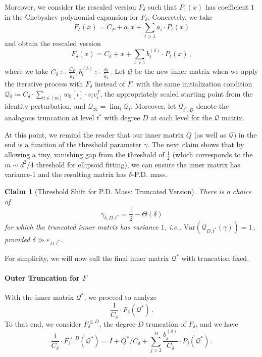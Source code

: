 \documentclass[12pt]{article}
\newcommand{\Var}{\mathrm{Var}}
\newtheorem{claim}[theorem]{Claim}
\newcommand{\calQ}{\mathcal{Q}}
\begin{document}
Moreover, we consider the rescaled version $F_\delta$ such that $P_1(x)$ has coefficient $1$ in the Chebyshev polynomial expansion for $F_\delta$. Concretely, we take \[
 \widetilde{F}_\delta(x) = \widetilde{C}_F + \widetilde{a}_1 x + \sum_{t>1} \widetilde{a}_i \cdot P_t(x)
 \]
 and obtain the rescaled version \[ 
 F_{\delta} (x) = C_\delta + x + \sum_{t>1} b^{(\delta)}_t \cdot P_t(x)\,,
 \]
 where we take \(
 C_\delta \coloneqq \frac{\widetilde{C}_F}{\widetilde{a}_1}, b^{(\delta)}_t\coloneqq  \frac{\widetilde{a}_t}{\widetilde{a}_1}\,.
  \)
  Let $\calQ$ be the new inner matrix when we apply the iterative process with $F_\delta$ instead of $F$, with the same initialization condition $\calQ_0 \coloneqq C_\delta \cdot \sum_{i\in[m]} w_0[i] \cdot v_iv_i^T$, the appropriately scaled starting point from the identity perturbation, and $\calQ_{\infty} = \lim_i \calQ_i$.  Moreover, let $\calQ_{t^*,D}$ denote the analogous truncation at level $t^*$ with degree $D$ at each level for the $\calQ$ matrix.

 At this point, we remind the reader that our inner matrix $Q$ (as well as $\calQ$) in the end is a function of the threshold parameter $\gamma$. The next claim shows that by allowing a tiny, vanishing gap from the threshold of $\frac{1}{2}$ (which corresponds to the $m\sim d^2/4$  threshold for ellipsoid fitting), we can ensure the inner matrix has variance-$1$ and the resulting matrix has $\delta$-P.D. mass.
 \begin{claim}[Threshold Shift for P.D. Mass: Truncated Version]
\label{claim:pd-shift-threshold}
There is a choice of
\[
    \gamma_{\delta,D,t^*}
    =
    \frac12-\Theta(\delta)
\]
for which the truncated inner matrix has variance $1$, i.e., \( 
\Var(\calQ_{D,t^*}(\gamma) )= 1\,,
\)
provided \(
    \delta \gg \varepsilon_{D,t^*}.
\)

\end{claim} 
 For simplicity, we will now call the final inner matrix $\calQ^*$ with truncation fixed.
 
 \paragraph{Outer Truncation for $F$}
 With the inner matrix   $\calQ^*$, we proceed to analyze \[ 
 \frac{1}{C_\delta} \cdot  F_\delta(\calQ^*)\,.
 \]
To that end, we consider $F_\delta^{\leq D}$, the degree-$D$ truncation of $F_\delta$, and we have  \[
\frac{1}{C_\delta} \cdot  F^{\leq D}_\delta(\calQ^*) = I + Q^*/C_\delta + \sum^D_{j>2} \frac{b^{(\delta)}_j}{C_\delta} \cdot P_j(\calQ^*)\,.
 \] 
 
\end{document}
